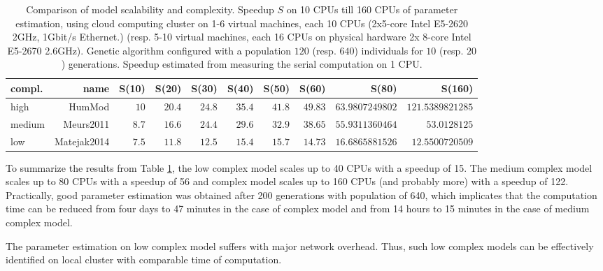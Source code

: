 \begin{table}[htb]
\footnotesize
\begin{tabular}{|l|r|r|r|r|r|r|r|r|r|}
\hline
compl. & name & S(10) & S(20) & S(30) & S(40) & S(50) & S(60) & S(80)& S(160)\\
\hline
high & HumMod \cite{Kofranek2011hummod} & $\num{10}$ & $\num{20.4}$ & $\num{24.8}$ & $\num{35.4}$ & $\num{41.8}$ & $\num{49.83}$ & $\num{63.9807249802}$ & $\num{121.5389821285}$ \\
medium & Meurs2011\cite{Meurs2011} & $\num{8.7}$ & $\num{16.6}$ & $\num{24.4}$ & $\num{29.6}$ & $\num{32.9}$ & $\num{38.65}$ & $\num{55.9311360464}$ & $\num{53.0128125}$ \\
low & Matejak2014\cite{Matejak2014sj} & $\num{7.5}$ & $\num{11.8}$ & $\num{12.5}$ & $\num{15.4}$ & $\num{15.7}$ & $\num{14.73}$ & $\num{16.6865881526}$ & $\num{12.5500720509}$\\ \hline
\end{tabular}
\caption{Comparison of model scalability and complexity. Speedup $S$ on 10 CPUs till 160 CPUs of parameter estimation, using cloud computing cluster on 1-6 virtual machines, each 10 CPUs (2x5-core Intel E5-2620 2GHz, 1Gbit/s Ethernet.) (resp. 5-10 virtual machines, each 16 CPUs on physical hardware 2x 8-core Intel E5-2670 2.6GHz). Genetic algorithm configured with a population $120$ (resp. $640$) individuals for $10$ (resp. $20$) generations. Speedup estimated from measuring the serial computation on 1 CPU.}
\label{table:speedupresult3}
\end{table}

To summarize the results from Table \ref{table:speedupresult3}, the low complex model scales up to 40 CPUs with a speedup of 15. The medium complex model scales up to 80 CPUs with a speedup of 56 and complex model scales up to 160 CPUs (and probably more) with a speedup of 122. Practically, good parameter estimation was obtained after 200 generations with population of 640, which implicates that the computation time can be reduced from four days to 47 minutes in the case of complex model and from 14 hours to 15 minutes in the case of medium complex model.

The parameter estimation on low complex model suffers with major network overhead. Thus, such low complex models can be effectively identified on local cluster with comparable time of computation.

